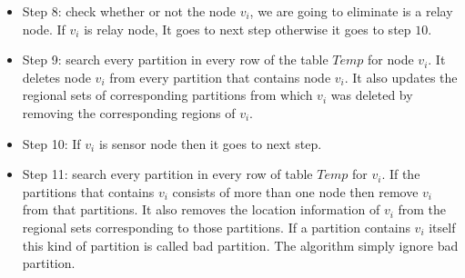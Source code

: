 \documentclass[12pt]{article}
\begin{document}
\begin{itemize}
\item Step 8: check whether or not the node $v_i$, we are going to eliminate is a relay node. If $v_i$ is relay node, It goes to next step otherwise it goes to step $10$.
\item Step 9: search every partition in every row of the table $Temp$ for node $v_i$. It deletes node $v_i$ from every partition that contains node $v_i$. It also updates the regional sets of corresponding partitions from which $v_i$ was deleted by removing the corresponding regions of $v_i$.
\item Step 10: If $v_i$ is sensor node then it goes to next step.
\item Step 11: search every partition in every row of table $Temp$ for $v_i$. If the partitions that contains $v_i$ consists of more than one node then remove $v_i$ from that partitions. It also removes the location information of $v_i$ from the regional sets corresponding to those partitions.
If a partition contains $v_i$ itself this kind of partition is called bad partition. The algorithm simply ignore bad partition.
\end{itemize}
\end{document}
